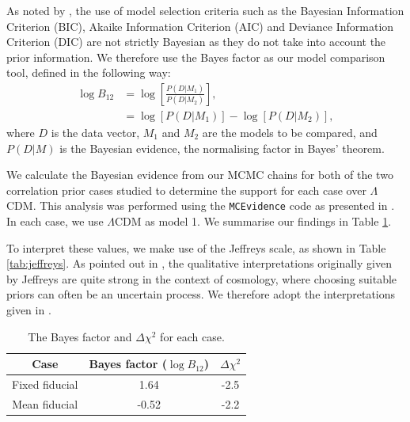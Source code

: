 \documentclass[final,3p,times,twocolumn]{elsarticle}
\begin{document}
As noted by \cite{Linares2019}, the use of model selection criteria such as the Bayesian Information Criterion (BIC), Akaike Information Criterion (AIC) and Deviance Information Criterion (DIC) are not strictly Bayesian as they do not take into account the prior information. We therefore use the Bayes factor as our model comparison tool, defined in the following way:
\begin{align}
\log B_{12} &= \log \left[\frac{P(D|M_1)}{P(D|M_2)}\right], \\
&= \log [P(D|M_1)] - \log [P(D|M_2)],
\end{align}
where $D$ is the data vector, $M_1$ and $M_2$ are the models to be compared, and $P(D|M)$ is the Bayesian evidence, the normalising factor in Bayes' theorem.

We calculate the Bayesian evidence from our MCMC chains for both of the two correlation prior cases studied to determine the support for each case over $\Lambda$CDM. This analysis was performed using the \texttt{MCEvidence} code as presented in \cite{Heavens:2017afc}. In each case, we use $\Lambda$CDM as model 1. We summarise our findings in Table \ref{tab:evidence}.

To interpret these values, we make use of the Jeffreys scale, as shown in Table \ref{tab:jeffreys}. As pointed out in \cite{Hobson}, the qualitative interpretations originally given by Jeffreys \cite{Jeffreys} are quite strong in the context of cosmology, where choosing suitable priors can often be an uncertain process. We therefore adopt the interpretations given in \cite{Hobson}.

\begin{table}
\centering
\begin{tabular}{|c|c|c|}
\hline
Case & Bayes factor ($\log B_{12}$)& $\Delta \chi^2$ \\
\hline
Fixed fiducial & 1.64 & -2.5\\
Mean fiducial &-0.52 &  -2.2\\
\hline
\end{tabular}
\caption{The Bayes factor and $\Delta \chi^2 $ for each case. \label{tab:evidence}}
\end{table}
\end{document}
